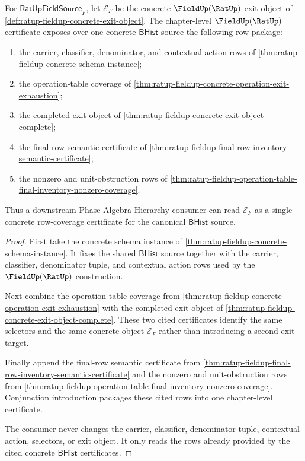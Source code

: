 \begin{theorem}
\label{thm:ratup-fieldup-chapter-certificate-row-coverage}
For $\mathsf{RatUpFieldSource}_F$, let $\mathcal E_F$ be the concrete
$\FieldUp(\RatUp)$ exit object of
\autoref{def:ratup-fieldup-concrete-exit-object}. The chapter-level
$\FieldUp(\RatUp)$ certificate exposes over one concrete $\mathsf{BHist}$
source the following row package:
\begin{enumerate}
  \item the carrier, classifier, denominator, and contextual-action rows of
  \autoref{thm:ratup-fieldup-concrete-schema-instance};
  \item the operation-table coverage of
  \autoref{thm:ratup-fieldup-concrete-operation-exit-exhaustion};
  \item the completed exit object of
  \autoref{thm:ratup-fieldup-concrete-exit-object-complete};
  \item the final-row semantic certificate of
  \autoref{thm:ratup-fieldup-final-row-inventory-semantic-certificate};
  \item the nonzero and unit-obstruction rows of
  \autoref{thm:ratup-fieldup-operation-table-final-inventory-nonzero-coverage}.
\end{enumerate}
Thus a downstream Phase Algebra Hierarchy consumer can read
$\mathcal E_F$ as a single concrete row-coverage certificate for the canonical
$\mathsf{BHist}$ source.
\end{theorem}
\begin{proof}
First take the concrete schema instance of
\autoref{thm:ratup-fieldup-concrete-schema-instance}. It fixes the shared
$\mathsf{BHist}$ source together with the carrier, classifier, denominator
tuple, and contextual action rows used by the $\FieldUp(\RatUp)$ construction.

Next combine the operation-table coverage from
\autoref{thm:ratup-fieldup-concrete-operation-exit-exhaustion} with the
completed exit object of
\autoref{thm:ratup-fieldup-concrete-exit-object-complete}. These two cited
certificates identify the same selectors and the same concrete object
$\mathcal E_F$ rather than introducing a second exit target.

Finally append the final-row semantic certificate from
\autoref{thm:ratup-fieldup-final-row-inventory-semantic-certificate} and the
nonzero and unit-obstruction rows from
\autoref{thm:ratup-fieldup-operation-table-final-inventory-nonzero-coverage}.
Conjunction introduction packages these cited rows into one chapter-level
certificate.

The consumer never changes the carrier, classifier, denominator tuple,
contextual action, selectors, or exit object. It only reads the rows already
provided by the cited concrete $\mathsf{BHist}$ certificates.
\end{proof}

